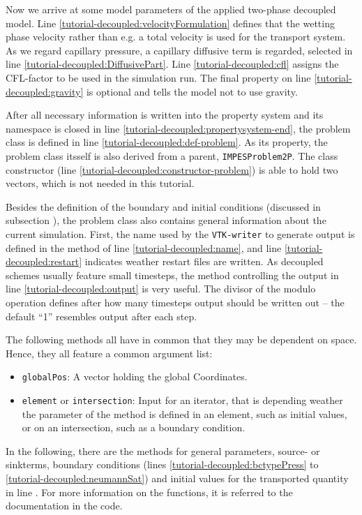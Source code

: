 Now we arrive at some model parameters of the applied two-phase decoupled 
model. Line \ref{tutorial-decoupled:velocityFormulation} defines that the 
wetting phase velocity rather than e.g. a total velocity is used for the 
transport system. As we regard capillary pressure, a capillary diffusive 
term is regarded, selected in line \ref{tutorial-decoupled:DiffusivePart}.
Line \ref{tutorial-decoupled:cfl} assigns the CFL-factor to be used in the
simulation run. The final property on line \ref{tutorial-decoupled:gravity} 
is optional and tells the model not to use gravity.

After all necessary information is written into the property system and 
its namespace is closed in line \ref{tutorial-decoupled:propertysystem-end},
the problem class is defined in line \ref{tutorial-decoupled:def-problem}. 
As its property, the problem class itsself is also derived from a parent, 
\texttt{IMPESProblem2P}. The class constructor (line 
\ref{tutorial-decoupled:constructor-problem}) is able to hold two vectors,
which is not needed in this tutorial.

Besides the definition of the boundary and initial conditions (discussed in 
subsection \label{decoupled-problem:boundary}), the problem class also contains
general information about the current simulation. First, the name used by
the \texttt{VTK-writer} to generate output is defined in the method of line
\ref{tutorial-decoupled:name}, and line \ref{tutorial-decoupled:restart} indicates
weather restart files are written. As decoupled schemes usually feature small 
timesteps, the method controlling the output in line \ref{tutorial-decoupled:output}
is very useful. The divisor of the modulo operation defines after how many timesteps
output should be written out -- the default ``1'' resembles output after each 
step.

The following methods all have in common that they may be dependent on space.
Hence, they all feature a common argument list:
\begin{itemize}
 \item \texttt{globalPos}: A vector holding the global Coordinates.
 \item \texttt{element} or \texttt{intersection}: Input for an iterator, that is 
    depending weather the parameter of the method is defined in an element, such as 
    initial values, or on an intersection, such as a boundary condition.
\end{itemize}
In the following, there are the methods for general parameters, source- or
sinkterms, boundary conditions (lines \ref{tutorial-decoupled:bctypePress} to
\ref{tutorial-decoupled:neumannSat}) and initial values for the transported
quantity in line \label{tutorial-decoupled:initSat}. For more information
on the functions, it is referred to the documentation in the code.

